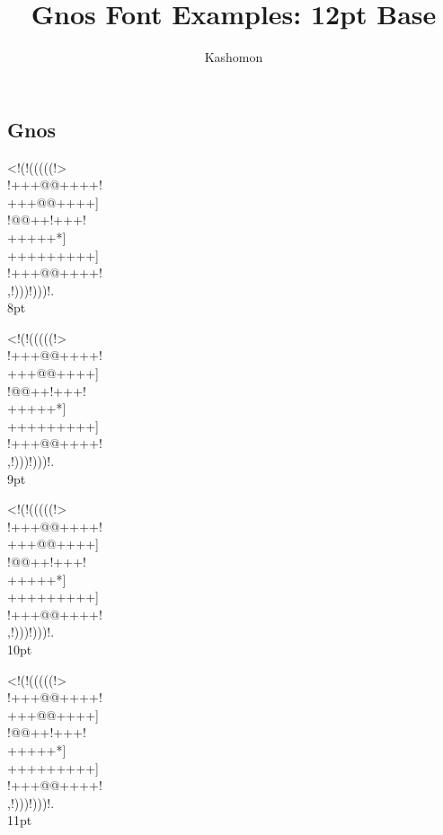 \documentclass[12pt]{article}
\begin{document}
\title{Gnos Font Examples: 12pt Base}
\author{Kashomon}
\maketitle

\begin{center}
\section*{Gnos}
{
\gnos%
<!(!(((((!>\\
!+++@@++++!\\
+++@@++++]\\
!@@++!+++!\\
+++++*]\\
+++++++++]\\
!+++@@++++!\\
,!)))!)))!.\\
}
8pt

{
\gnos%
<!(!(((((!>\\
!+++@@++++!\\
+++@@++++]\\
!@@++!+++!\\
+++++*]\\
+++++++++]\\
!+++@@++++!\\
,!)))!)))!.\\
}
9pt


{
\gnos%
<!(!(((((!>\\
!+++@@++++!\\
+++@@++++]\\
!@@++!+++!\\
+++++*]\\
+++++++++]\\
!+++@@++++!\\
,!)))!)))!.\\
}
10pt

\newpage

{
\gnos%
<!(!(((((!>\\
!+++@@++++!\\
+++@@++++]\\
!@@++!+++!\\
+++++*]\\
+++++++++]\\
!+++@@++++!\\
,!)))!)))!.\\
}
11pt


\end{center}
\end{document}
